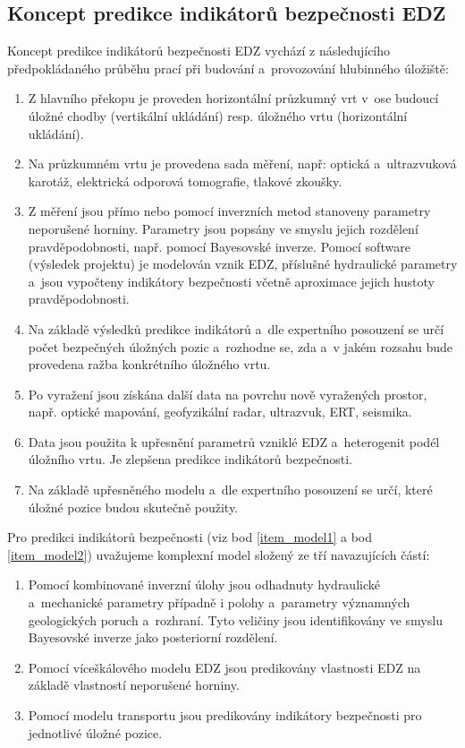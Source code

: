 \documentclass{article}
\begin{document}
\subsection{Koncept predikce indikátorů bezpečnosti EDZ}



Koncept predikce indikátorů bezpečnosti EDZ vychází z následujícího předpokládaného průběhu prací 
při budování a~provozování hlubinného úložiště:
\begin{enumerate}
    \item Z hlavního překopu je proveden horizontální průzkumný vrt v~ose budoucí úložné chodby
        (vertikální ukládání) resp. úložného vrtu (horizontální ukládání).
    \item Na průzkumném vrtu je provedena sada měření, 
          např: optická a~ultrazvuková karotáž, elektrická odporová tomografie, tlakové zkoušky.

    \item \label{item_model1}
        Z měření jsou přímo nebo pomocí inverzních metod stanoveny parametry neporušené horniny.
        Parametry jsou popsány ve smyslu jejich rozdělení pravděpodobnosti, 
        např. pomocí Bayesovské inverze. Pomocí software (výsledek projektu) je modelován vznik EDZ,
        příslušné hydraulické parametry a~jsou vypočteny indikátory bezpečnosti včetně aproximace 
        jejich hustoty pravděpodobnosti.
    \item Na základě výsledků predikce indikátorů a~dle expertního posouzení se určí počet bezpečných
        úložných pozic a~rozhodne se, zda a~v jakém rozsahu bude provedena ražba  konkrétního úložného vrtu.
    \item Po vyražení jsou získána další data na povrchu nově vyražených prostor, např. optické mapování, 
        geofyzikální radar, ultrazvuk, ERT, seismika. 
    \item Data jsou použita k upřesnění parametrů vzniklé EDZ a~heterogenit podél úložního vrtu. 
        Je zlepšena predikce indikátorů bezpečnosti.  
    \item \label{item_model2}
        Na základě upřesněného modelu a~dle expertního posouzení se určí, které úložné pozice budou 
        skutečně použity.
\end{enumerate}


Pro predikci indikátorů bezpečnosti (viz bod \ref{item_model1} 
a bod \ref{item_model2}) uvažujeme komplexní model složený ze tří navazujících částí: 
    \begin{enumerate}
    \item Pomocí kombinované inverzní úlohy jsou odhadnuty hydraulické a~mechanické
     parametry  případně i polohy a~parametry významných geologických poruch a~rozhraní. 
     Tyto veličiny jsou identifikovány ve smyslu Bayesovské inverze jako posteriorní rozdělení.
    \item Pomocí víceškálového modelu EDZ jsou predikovány vlastnosti EDZ na základě vlastností neporušené horniny.
    \item Pomocí modelu transportu jsou predikovány indikátory bezpečnosti pro jednotlivé úložné pozice.
    \end{enumerate}
\end{document}

